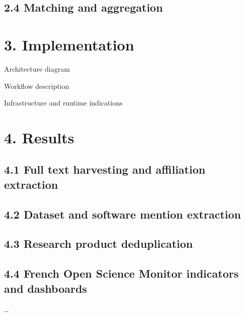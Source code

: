 \documentclass[
]{article}
\begin{document}
\hypertarget{matching-and-aggregation}{%
\subsection{2.4 Matching and
aggregation}\label{matching-and-aggregation}}

\hypertarget{implementation}{%
\section{3. Implementation}\label{implementation}}

Architecture diagram

Workflow description

Infrastructure and runtime indications

\hypertarget{results}{%
\section{4. Results}\label{results}}

\hypertarget{full-text-harvesting-and-affiliation-extraction}{%
\subsection{4.1 Full text harvesting and affiliation
extraction}\label{full-text-harvesting-and-affiliation-extraction}}

\hypertarget{dataset-and-software-mention-extraction}{%
\subsection{4.2 Dataset and software mention
extraction}\label{dataset-and-software-mention-extraction}}

\hypertarget{research-product-deduplication}{%
\subsection{4.3 Research product
deduplication}\label{research-product-deduplication}}

\hypertarget{french-open-science-monitor-indicators-and-dashboards}{%
\subsection{4.4 French Open Science Monitor indicators and
dashboards}\label{french-open-science-monitor-indicators-and-dashboards}}

\ldots{}
\end{document}
